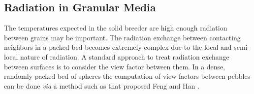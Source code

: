 






\subsection{Radiation in Granular Media}

The temperatures expected in the solid breeder are high enough radiation between grains may be important. The radiation exchange between contacting neighbors in a packed bed becomes extremely complex due to the local and semi-local nature of radiation. A standard approach to treat radiation exchange between surfaces is to consider the view factor between them. In a dense, randomly packed bed of spheres the computation of view factors between pebbles can be done \textit{via} a method such as that proposed Feng and Han \cite{Feng2012}. 

